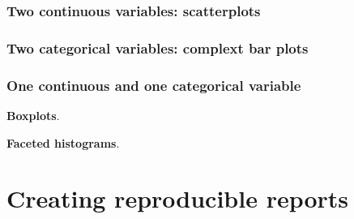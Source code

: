 \documentclass[
]{book}
\begin{document}
\hypertarget{two-continuous-variables-scatterplots}{%
\subsection{Two continuous variables: scatterplots}\label{two-continuous-variables-scatterplots}}

\hypertarget{two-categorical-variables-complext-bar-plots}{%
\subsection{Two categorical variables: complext bar plots}\label{two-categorical-variables-complext-bar-plots}}

\hypertarget{one-continuous-and-one-categorical-variable}{%
\subsection{One continuous and one categorical variable}\label{one-continuous-and-one-categorical-variable}}

\textbf{Boxplots}.

\textbf{Faceted histograms}.

\hypertarget{reproducible}{%
\chapter{Creating reproducible reports}\label{reproducible}}

  
\end{document}
